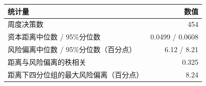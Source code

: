 \begin{tabular}{lr}
\toprule
统计量 & 数值\\\midrule
周度决策数 & 454\\
资本距离中位数 / 95\%分位数 & 0.0499 / 0.0608\\
风险偏离中位数 / 95\%分位数（百分点） & 6.12 / 8.21\\
距离与风险偏离的秩相关 & 0.325\\
距离下四分位组的最大风险偏离（百分点） & 8.24\\
\bottomrule
\end{tabular}
